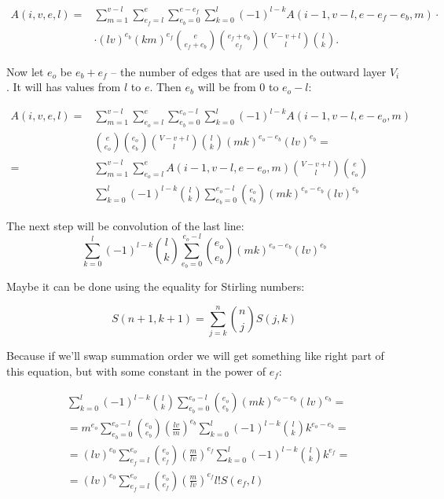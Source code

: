 \documentclass{llncs}
\begin{document}
  \begin{align*}
    A(i,v,e,l)  = & \sum_{m = 1}^{v - l} \sum_{e_f = l}^{e} \sum_{e_b = 0}^{e - e_f} \sum_{k = 0}^{l} (-1)^{l-k} A(i - 1, v - l, e - e_f - e_b, m) \cdot \\ 
    & \cdot (l v)^{e_b} (km)^{e_f} \binom{e}{e_f + e_b} \binom{e_f + e_b}{e_f} \binom{V - v + l}{l} \binom{l}{k}.
  \end{align*} 
  
  Now let $e_o$ be $e_b + e_f$ -- the number of edges that are used in the outward layer $V_i$. It will has values from $l$ to $e$. Then $e_b$ will be from $0$ to $e_o - l$:
  
  \begin{align*}
  A(i, v, e, l) = & \sum_{m = 1}^{v - l}\sum_{e_o = l}^{e}\sum_{e_b = 0}^{e_o - l}\sum_{k = 0}^{l} (-1)^{l - k} A(i - 1, v - l, e - e_o, m) \\
  &  {e \choose e_o} {e_o \choose e_b} {V - v + l \choose l} {l \choose k} (mk)^{e_o - e_b} (lv)^{e_b} = \\
  = & \sum_{m = 1}^{v - l}\sum_{e_o = l}^{e}  A(i - 1, v - l, e - e_o, m) {V - v + l \choose l} {e \choose e_o} \\
  & \sum_{k = 0}^{l} (-1)^{l - k} {l \choose k} \sum_{e_b = 0}^{e_o - l} {e_o \choose e_b} (mk)^{e_o - e_b} (lv)^{e_b}
  \end{align*}
  
  The next step will be convolution of the last line:
  $$ \sum_{k = 0}^{l} (-1)^{l - k} {l \choose k} \sum_{e_b = 0}^{e_o - l} {e_o \choose e_b} (mk)^{e_o - e_b} (lv)^{e_b}$$
  
  Maybe it can be done using the equality for Stirling numbers:
  
  $$S(n + 1, k + 1) = \sum_{j = k}^{n} {n \choose j} S(j, k)$$
  
  Because if we'll swap summation order we will get something like right part of this equation, but with some constant in the power of $e_f$:
  
  \begin{align*}
  & \sum_{k = 0}^{l} (-1)^{l - k} {l \choose k} \sum_{e_b = 0}^{e_o - l} {e_o \choose e_b} (mk)^{e_o - e_b} (lv)^{e_b} = \\
  & = m^{e_o} \sum_{e_b = 0}^{e_o - l} {e_0 \choose e_b} \left(\frac{lv}{m}\right)^{e_b} \sum_{k = 0}^{l} (-1)^{l - k} {l \choose k} k^{e_o - e_b} = \\
  & = (lv)^{e_0} \sum_{e_f = l}^{e_o} {e_o \choose e_f} \left(\frac{m}{lv}\right)^{e_f}\sum_{k = 0}^{l} (-1)^{l - k} {l \choose k} k^{e_f} = \\
  & = (lv)^{e_0} \sum_{e_f = l}^{e_o} {e_o \choose e_f} \left(\frac{m}{lv}\right)^{e_f} l! S(e_f, l) 
  \end{align*} 
  
\end{document}
